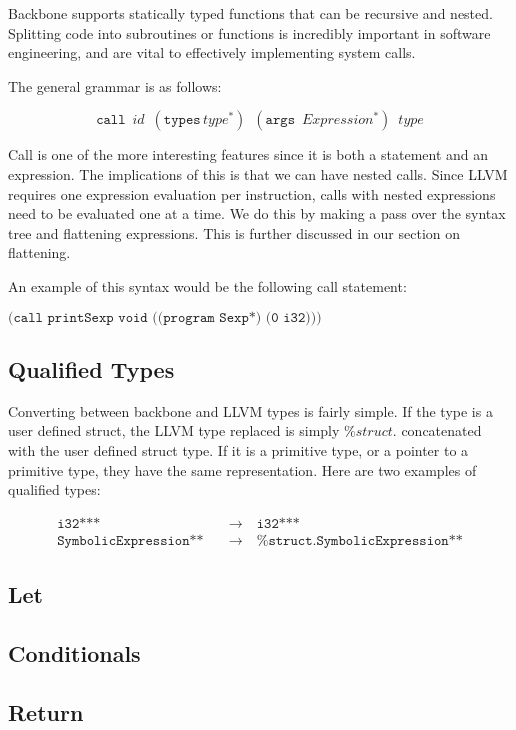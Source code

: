 \documentclass[journal=jacsat, manuscript=article]{achemso}
\begin{document}
Backbone supports statically typed functions that can be recursive and nested. Splitting code into
subroutines or functions is incredibly important in software engineering, and are vital to effectively
implementing system calls.

The general grammar is as follows:

$$\texttt{call}\,\,\,id\,\,\,(\texttt{types}\,type^*)\,\,\,(\texttt{args}\,\,\,Expression^*)\,\,\,type$$

Call is one of the more interesting features since it is both a statement and an expression.
The implications of this is that we can have nested calls. Since LLVM requires one expression evaluation
per instruction, calls with nested expressions need to be evaluated one at a time. We do this by
making a pass over the syntax tree and flattening expressions. This is further discussed in our section
on flattening.

An example of this syntax would be the following call statement:

$\texttt{(call printSexp void ((program Sexp*) (0 i32)))}$

\subsection{Qualified Types}

Converting between backbone and LLVM types is fairly simple. If the type is a user defined struct,
the LLVM type replaced is simply $\%struct.$ concatenated with the user defined struct type. If it
is a primitive type, or a pointer to a primitive type, they have the same representation. Here
are two examples of qualified types:

\begin{align}
\texttt{i32***}\quad &\rightarrow \quad \texttt{i32***} \\
\texttt{SymbolicExpression**}\quad &\rightarrow\quad \texttt{\%struct.SymbolicExpression**}
\end{align}

\subsection{Let}


\subsection{Conditionals}
\subsection{Return}
\end{document}
